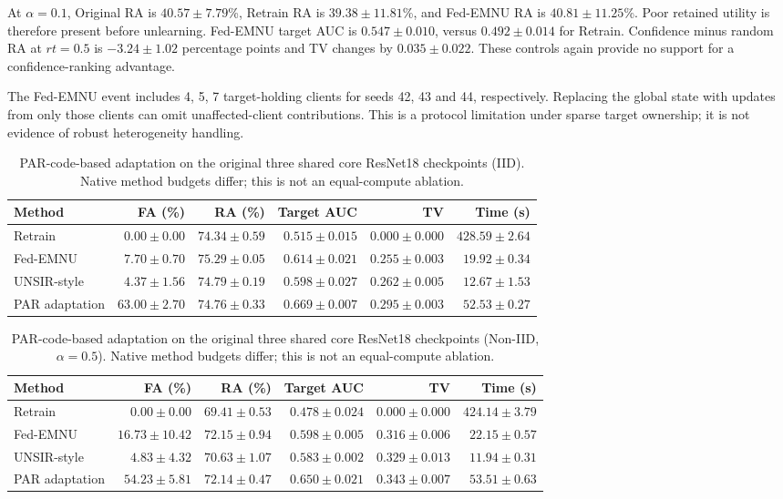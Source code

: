At $\alpha=0.1$, Original RA is $40.57 \pm 7.79$\%, Retrain RA is $39.38 \pm 11.81$\%, and Fed-EMNU RA is $40.81 \pm 11.25$\%. Poor retained utility is therefore present before unlearning. Fed-EMNU target AUC is $0.547 \pm 0.010$, versus $0.492 \pm 0.014$ for Retrain. Confidence minus random RA at $rt=0.5$ is $-3.24 \pm 1.02$ percentage points and TV changes by $0.035 \pm 0.022$. These controls again provide no support for a confidence-ranking advantage.

The Fed-EMNU event includes 4, 5, 7 target-holding clients for seeds 42, 43 and 44, respectively. Replacing the global state with updates from only those clients can omit unaffected-client contributions. This is a protocol limitation under sparse target ownership; it is not evidence of robust heterogeneity handling.

\begin{table}[H]
\caption{PAR-code-based adaptation on the original three shared core ResNet18 checkpoints (IID). Native method budgets differ; this is not an equal-compute ablation.}
\label{tab:par-iid}
\centering\scriptsize\setlength{\tabcolsep}{3.5pt}
\begin{tabular}{lrrrrr}
\toprule
Method & FA (\%) & RA (\%) & Target AUC & TV & Time (s)\\
\midrule
Retrain & $0.00 \pm 0.00$ & $74.34 \pm 0.59$ & $0.515 \pm 0.015$ & $0.000 \pm 0.000$ & $428.59 \pm 2.64$\\
Fed-EMNU & $7.70 \pm 0.70$ & $75.29 \pm 0.05$ & $0.614 \pm 0.021$ & $0.255 \pm 0.003$ & $19.92 \pm 0.34$\\
UNSIR-style & $4.37 \pm 1.56$ & $74.79 \pm 0.19$ & $0.598 \pm 0.027$ & $0.262 \pm 0.005$ & $12.67 \pm 1.53$\\
PAR adaptation & $63.00 \pm 2.70$ & $74.76 \pm 0.33$ & $0.669 \pm 0.007$ & $0.295 \pm 0.003$ & $52.53 \pm 0.27$\\
\bottomrule
\end{tabular}
\end{table}

\begin{table}[H]
\caption{PAR-code-based adaptation on the original three shared core ResNet18 checkpoints (Non-IID, $\alpha=0.5$). Native method budgets differ; this is not an equal-compute ablation.}
\label{tab:par-noniid}
\centering\scriptsize\setlength{\tabcolsep}{3.5pt}
\begin{tabular}{lrrrrr}
\toprule
Method & FA (\%) & RA (\%) & Target AUC & TV & Time (s)\\
\midrule
Retrain & $0.00 \pm 0.00$ & $69.41 \pm 0.53$ & $0.478 \pm 0.024$ & $0.000 \pm 0.000$ & $424.14 \pm 3.79$\\
Fed-EMNU & $16.73 \pm 10.42$ & $72.15 \pm 0.94$ & $0.598 \pm 0.005$ & $0.316 \pm 0.006$ & $22.15 \pm 0.57$\\
UNSIR-style & $4.83 \pm 4.32$ & $70.63 \pm 1.07$ & $0.583 \pm 0.002$ & $0.329 \pm 0.013$ & $11.94 \pm 0.31$\\
PAR adaptation & $54.23 \pm 5.81$ & $72.14 \pm 0.47$ & $0.650 \pm 0.021$ & $0.343 \pm 0.007$ & $53.51 \pm 0.63$\\
\bottomrule
\end{tabular}
\end{table}

